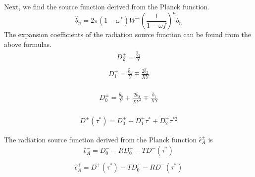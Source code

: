 Next, we find the source function derived from the Planck function. \begin{equation}
\hat{b}_{n}=2 \pi\left(1-\omega^{*}\right) W^{-}\left(\frac{1}{1-\omega f}\right)^{n} b_{n}
\end{equation} The expansion coefficients of the radiation source function can be
found from the above formulas. \begin{equation}
\begin{array}{l}
D_{2}^{\pm}=\frac{\hat{b}_{2}}{Y} \\
\end{array}
\end{equation} \begin{equation}
\begin{array}{l}
D_{1}^{\pm}=\frac{\hat{b}_{1}}{Y} \mp \frac{2 \hat{b}_{2}}{X Y} \\
\end{array}
\end{equation}

\begin{equation}
\begin{array}{l}
D_{0}^{\pm}=\frac{\hat{b}_{0}}{Y}+\frac{2 \hat{b}_{2}}{X Y^{2}} \mp \frac{\hat{b}_{1}}{X Y} \\
\end{array}
\end{equation}

\begin{equation}
\begin{array}{l}
D^{\pm}\left(\tau^{*}\right)=D_{0}^{+}+D_{1}^{+} \tau^{*}+D_{2}^{+} \tau^{* 2}
\end{array}
\end{equation}

The radiation source function derived from the Planck function
\(\hat{\epsilon}_{A}^{\pm}\) is \begin{equation}
\begin{array}{l}
\hat{\epsilon}_{A}^{-}=D_{0}^{-}-R D_{0}^{-}-T D^{-}\left(\tau^{*}\right) \\
\end{array}
\end{equation} \begin{equation}
\begin{array}{l}
\hat{\epsilon}_{A}^{+}=D^{+}\left(\tau^{*}\right)-T D_{0}^{+}-R D^{-}\left(\tau^{*}\right)
\end{array}
\end{equation}


